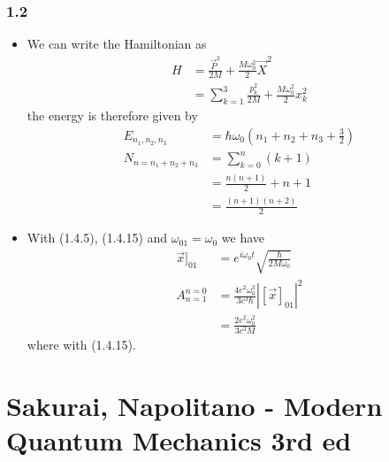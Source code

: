 \documentclass[10pt,a4paper]{book}
\theoremstyle{definition}
\begin{document}
\subsubsection{1.2}
\begin{itemize}
\item We can write the Hamiltonian as
\begin{align}
    H&=\frac{\vec{P}^2}{2M}+\frac{M\omega_0^2}{2}\vec{X}^2\\
    &=\sum_{k=1}^3\frac{p_k^2}{2M}+\frac{M\omega_0^2}{2}x_k^2
\end{align}
the energy is therefore given by
\begin{align}
    E_{n_1,n_2,n_3}&=\hbar\omega_0\left(n_1+n_2+n_3+\frac{3}{2}\right)\\
    N_{n=n_1+n_2+n_3}&=\sum_{k=0}^{n}(k+1)\\
    &=\frac{n(n+1)}{2}+n+1\\
    &=\frac{(n+1)(n+2)}{2}
\end{align}

\item With (1.4.5), (1.4.15) and $\omega_{01}=\omega_0$ we have
\begin{align}
    \vec{x}]_{01}&=e^{i\omega_0 t}\sqrt{\frac{\hbar}{2M\omega_0}}\\
    A_{n=1}^{n=0}&=\frac{4e^2\omega_0^3}{3c^3\hbar}\left|[\vec{x}]_{01}\right|^2\\
    &=\frac{2e^2\omega_0^2}{3c^3M}
\end{align}
where with (1.4.15).
\end{itemize}

\section{{\sc Sakurai, Napolitano} - Modern Quantum Mechanics 3rd ed}
\end{document}
